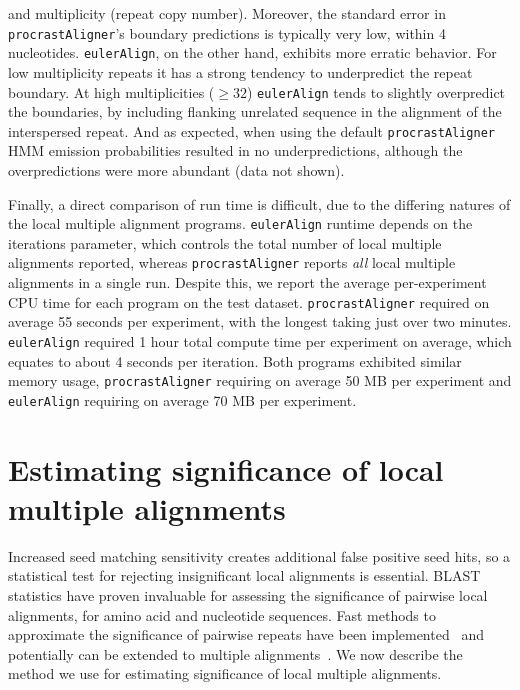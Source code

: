 \documentclass[9.5pt,journal,final,finalsubmission,twocolumn]{IEEEtran}
\begin{document}
and multiplicity (repeat copy number).  Moreover, the standard error in \texttt{procrastAligner}'s
boundary predictions is typically very low, within 4 nucleotides.  \texttt{eulerAlign}, on the other hand,
exhibits more erratic behavior.  For low multiplicity repeats it has a strong tendency to
underpredict the repeat boundary.  At high multiplicities ($\geq32$) \texttt{eulerAlign} tends to
slightly overpredict the boundaries, by including flanking unrelated sequence in the alignment of
the interspersed repeat.  And as expected, when using the default \texttt{procrastAligner} HMM emission probabilities resulted in no underpredictions, although the overpredictions were more abundant (data not shown).

Finally, a direct comparison of run time is difficult, due to the differing natures of the local multiple alignment programs.  \texttt{eulerAlign} runtime depends on the iterations parameter, which controls the total number of local multiple alignments reported, whereas \texttt{procrastAligner} reports \textit{all} local multiple alignments in a single run.  Despite this, we report the average per-experiment CPU time for each program on the test dataset. \texttt{procrastAligner} required on average 55 seconds per experiment, with the longest taking just over two minutes. \texttt{eulerAlign} required 1 hour total compute time per experiment on average, which equates to about 4 seconds per iteration.  Both programs exhibited similar memory usage, \texttt{procrastAligner} requiring on average 50 MB per experiment and \texttt{eulerAlign} requiring on average 70 MB per experiment.


\section{Estimating significance of local multiple alignments}
Increased seed matching sensitivity creates additional
false positive seed hits, so a statistical test for rejecting
insignificant local alignments is essential.  BLAST statistics have proven
invaluable for assessing the significance of pairwise local alignments, for amino acid and nucleotide sequences.
Fast methods to approximate the significance of pairwise
repeats have been implemented~\cite{repseek} and potentially can be
extended to multiple alignments~\cite{ref-related1, Prakash2005}.  We
now describe the method we use for estimating significance of local
multiple alignments.
\end{document}
